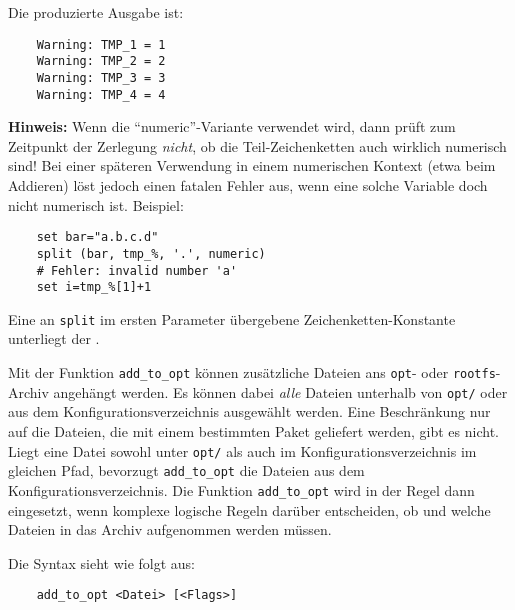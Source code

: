     Die produzierte Ausgabe ist:

\begin{example}
\begin{verbatim}
    Warning: TMP_1 = 1
    Warning: TMP_2 = 2
    Warning: TMP_3 = 3
    Warning: TMP_4 = 4
\end{verbatim}
\end{example}

    \textbf{Hinweis:} Wenn die "`numeric"'-Variante verwendet wird, dann prüft
     zum Zeitpunkt der Zerlegung \emph{nicht}, ob die
    Teil-Zeichenketten auch wirklich numerisch sind! Bei einer späteren
    Verwendung in einem numerischen Kontext (etwa beim Addieren) löst
     jedoch einen fatalen Fehler aus, wenn eine solche Variable
    doch nicht numerisch ist. Beispiel:

\begin{example}
\begin{verbatim}
    set bar="a.b.c.d"
    split (bar, tmp_%, '.', numeric)
    # Fehler: invalid number 'a'
    set i=tmp_%[1]+1
\end{verbatim}
\end{example}

    Eine an \texttt{split} im ersten Parameter übergebene
    Zeichenketten-Konstante unterliegt der
    .


    Mit der Funktion \texttt{add\_to\_opt} können zusätzliche Dateien
    ans \texttt{opt}- oder \texttt{rootfs}-Archiv angehängt werden. Es können dabei \emph{alle}
    Dateien unterhalb von \texttt{opt/} oder aus dem Konfigurationsverzeichnis
    ausgewählt werden. Eine Beschränkung nur auf die Dateien, die mit einem
    bestimmten Paket geliefert werden, gibt es nicht. Liegt eine Datei
    sowohl unter \texttt{opt/} als auch im Konfigurationsverzeichnis im
    gleichen Pfad, bevorzugt \texttt{add\_to\_opt} die Dateien aus dem
    Konfigurationsverzeichnis. Die Funktion \texttt{add\_to\_opt} wird in der
    Regel dann eingesetzt, wenn komplexe logische Regeln darüber entscheiden,
    ob und welche Dateien in das Archiv aufgenommen werden müssen.

    Die Syntax sieht wie folgt aus:
\begin{example}
\begin{verbatim}
    add_to_opt <Datei> [<Flags>]
\end{verbatim}
\end{example}

